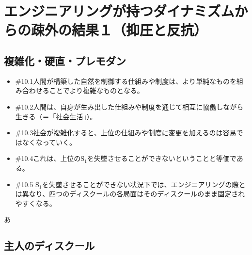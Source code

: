 \section{エンジニアリングが持つダイナミズムからの疎外の結果１（抑圧と反抗）}\label{ux30a8ux30f3ux30b8ux30cbux30a2ux30eaux30f3ux30b0ux304cux6301ux3064ux30c0ux30a4ux30caux30dfux30baux30e0ux304bux3089ux306eux758eux5916ux306eux7d50ux679cuxff11ux6291ux5727ux3068ux53cdux6297}

\subsection{複雑化・硬直・プレモダン}\label{ux8907ux96d1ux5316ux786cux76f4ux30d7ux30ecux30e2ux30c0ux30f3}

\begin{note}{}
  \begin{itemize}
    \tightlist
    \item{\#10.1}人間が構築した自然を制御する仕組みや制度は、より単純なものを組み合わせることでより複雑なものとなる。
    \item{\#10.2}人間は、自身が生み出した仕組みや制度を通じて相互に協働しながら生きる（＝「社会生活」）。
    \item{\#10.3}社会が複雑化すると、上位の仕組みや制度に変更を加えるのは容易ではなくなっていく。
    \item{\#10.4}これは、上位の$\textrm{S}_1$を失墜させることができないということと等価である。
    \item{\#10.5} $\textrm{S}_1$を失墜させることができない状況下では、エンジニアリングの際とは異なり、四つのディスクールの各局面はそのディスクールのまま固定されやすくなる。
  \end{itemize}
\end{note}

あ

\subsection{主人のディスクール}\label{ux4e3bux4ebaux306eux30c7ux30a3ux30b9ux30afux30fcux30eb}

